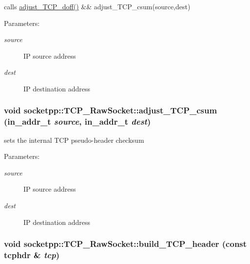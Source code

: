 calls \hyperlink{classsocketpp_1_1TCP__RawSocket_029eb8bfbf19531253edf046775d9f5f}{adjust\_\-TCP\_\-doff()} \&\& adjust\_\-TCP\_\-csum(source,dest) 

\begin{Desc}
\item[Parameters:]
\begin{description}
\item[{\em source}]IP source address \item[{\em dest}]IP destination address \end{description}
\end{Desc}
\hypertarget{classsocketpp_1_1TCP__RawSocket_c1a2ef8b2661bb0f3ca3fa6a636b25fd}{
\subsubsection[{adjust\_\-TCP\_\-csum}]{\setlength{\rightskip}{0pt plus 5cm}void socketpp::TCP\_\-RawSocket::adjust\_\-TCP\_\-csum (in\_\-addr\_\-t {\em source}, \/  in\_\-addr\_\-t {\em dest})}}
\label{classsocketpp_1_1TCP__RawSocket_c1a2ef8b2661bb0f3ca3fa6a636b25fd}


sets the internal TCP pseudo-header checksum 

\begin{Desc}
\item[Parameters:]
\begin{description}
\item[{\em source}]IP source address \item[{\em dest}]IP destination address \end{description}
\end{Desc}
\hypertarget{classsocketpp_1_1TCP__RawSocket_8c35edfc4d8c2fbccf0fe13485dd2ef1}{
\subsubsection[{build\_\-TCP\_\-header}]{\setlength{\rightskip}{0pt plus 5cm}void socketpp::TCP\_\-RawSocket::build\_\-TCP\_\-header (const tcphdr \& {\em tcp})}}
\label{classsocketpp_1_1TCP__RawSocket_8c35edfc4d8c2fbccf0fe13485dd2ef1}



